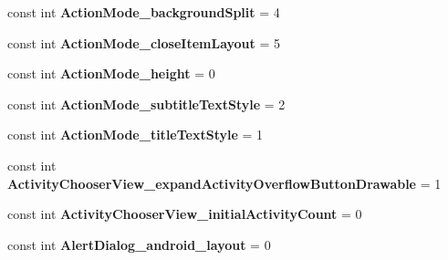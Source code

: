 \begin{DoxyCompactItemize}
\item 
\hypertarget{classClient_1_1Droid_1_1Resource_1_1Styleable_a34cd4f922512a38e9397e9efda4454d7}{}const int {\bfseries Action\+Mode\+\_\+background\+Split} = 4\label{classClient_1_1Droid_1_1Resource_1_1Styleable_a34cd4f922512a38e9397e9efda4454d7}

\item 
\hypertarget{classClient_1_1Droid_1_1Resource_1_1Styleable_a07aceab793e19dd2bc371373e1f70be2}{}const int {\bfseries Action\+Mode\+\_\+close\+Item\+Layout} = 5\label{classClient_1_1Droid_1_1Resource_1_1Styleable_a07aceab793e19dd2bc371373e1f70be2}

\item 
\hypertarget{classClient_1_1Droid_1_1Resource_1_1Styleable_a69a2e95e6e460287b7ef119f5e56c2ac}{}const int {\bfseries Action\+Mode\+\_\+height} = 0\label{classClient_1_1Droid_1_1Resource_1_1Styleable_a69a2e95e6e460287b7ef119f5e56c2ac}

\item 
\hypertarget{classClient_1_1Droid_1_1Resource_1_1Styleable_ac5bf348ed4696bec4b65f2c2800603aa}{}const int {\bfseries Action\+Mode\+\_\+subtitle\+Text\+Style} = 2\label{classClient_1_1Droid_1_1Resource_1_1Styleable_ac5bf348ed4696bec4b65f2c2800603aa}

\item 
\hypertarget{classClient_1_1Droid_1_1Resource_1_1Styleable_a966949c5443196ade9f8e1b91a9e60a9}{}const int {\bfseries Action\+Mode\+\_\+title\+Text\+Style} = 1\label{classClient_1_1Droid_1_1Resource_1_1Styleable_a966949c5443196ade9f8e1b91a9e60a9}

\item 
\hypertarget{classClient_1_1Droid_1_1Resource_1_1Styleable_aa182c98c438732b8d98e43e889f803fc}{}const int {\bfseries Activity\+Chooser\+View\+\_\+expand\+Activity\+Overflow\+Button\+Drawable} = 1\label{classClient_1_1Droid_1_1Resource_1_1Styleable_aa182c98c438732b8d98e43e889f803fc}

\item 
\hypertarget{classClient_1_1Droid_1_1Resource_1_1Styleable_a6b4085f421271e2e3745dbd405603724}{}const int {\bfseries Activity\+Chooser\+View\+\_\+initial\+Activity\+Count} = 0\label{classClient_1_1Droid_1_1Resource_1_1Styleable_a6b4085f421271e2e3745dbd405603724}

\item 
\hypertarget{classClient_1_1Droid_1_1Resource_1_1Styleable_ac0bfdf5e1a4d8f6ac4c2d7e615d0916a}{}const int {\bfseries Alert\+Dialog\+\_\+android\+\_\+layout} = 0\label{classClient_1_1Droid_1_1Resource_1_1Styleable_ac0bfdf5e1a4d8f6ac4c2d7e615d0916a}


\end{DoxyCompactItemize}
